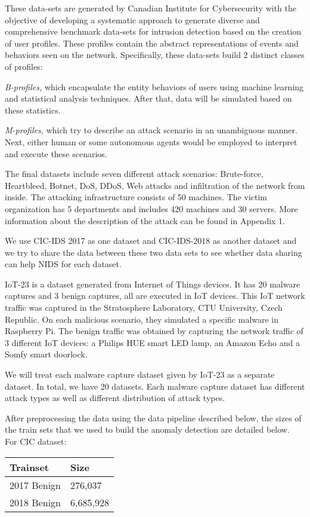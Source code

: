 \begin{background}
These data-sets are generated by Canadian Institute for Cybersecurity with the objective of developing a systematic approach to generate diverse and comprehensive benchmark data-sets for intrusion detection based on the creation of user profiles. These profiles contain the abstract representations of events and behaviors seen on the network. Specifically, these data-sets build 2 distinct classes of profiles:

\textit{B-profiles,} which encapsulate the entity behaviors of users using machine learning and statistical analysis  techniques. After that, data will be simulated based on these statistics.

\textit{M-profiles,} which try to describe an attack scenario in an unambiguous manner. Next, either human or some autonomous agents would be employed to interpret and execute these scenarios. 

The final datasets include seven different attack scenarios: Brute-force, Heartbleed, Botnet, DoS, DDoS, Web attacks and infiltration of the network from inside. The attacking infrastructure consists of 50 machines. The victim organization has 5 departments and includes 420 machines and 30 servers. More information about the description of the attack can be found in Appendix 1.

We use CIC-IDS 2017 as one dataset and CIC-IDS-2018 as another dataset and we try to share the data between these two data sets to see whether data sharing can help NIDS for each dataset.

IoT-23 is a dataset generated from Internet of Things devices. It has 20 malware captures and 3 benign captures, all are executed in IoT devices. This IoT network traffic was captured in the Stratosphere Laboratory, CTU University, Czech Republic. On each malicious scenario, they simulated a specific malware in Raspberry Pi. The benign traffic was obtained by capturing the network traffic of 3 different IoT devices: a Philips HUE smart LED lamp, an Amazon Echo and a Somfy smart doorlock.

We will treat each malware capture dataset given by IoT-23 as a separate dataset. In total, we have 20 datasets. Each malware capture dataset has different attack types as well as different distribution of attack types.

After preprocessing the data using the data pipeline described below, the sizes of the train sets that we used to build the anomaly detection are detailed below.\\
For CIC dataset:
\begin{table}[!ht]
    \centering
    \begin{tabular}{|l|l|}
    \hline
        Trainset & Size \\ \hline
        2017 Benign & 276,037 \\ \hline
        2018 Benign & 6,685,928 \\ \hline
    \end{tabular}
\end{table}


\end{background}

